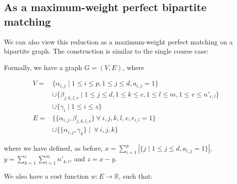 \subsection{As a maximum-weight perfect bipartite matching}
We can also view this reduction as a maximum-weight perfect matching on a bipartite graph. The construction is similar to the single course case:

\begin{center}
\end{center}

Formally, we have a graph $G = (V, E)$, where

\begin{align*}
  V = & \{\alpha_{i, j} \mid 1 \le i \le p, 1 \le j \le d, a_{i, j} = 1\}\\
    & \cup \{\beta_{j, k, l, v} \mid 1 \le j \le d, 1 \le k \le c, 1 \le l \le m, 1 \le v \le n'_{c, l}\}\\
    & \cup \{\gamma_i \mid 1 \le i \le z\}\\
  E = & \{\{\alpha_{i, j}, \beta_{j, k, l, v}\}\ \forall\ i, j, k, l, v, r_{i, l} = 1\}\\
      & \cup \{\{\alpha_{i, j}, \gamma_k\} \mid \ \forall\ i, j, k\}
\end{align*}

where we have defined, as before, $x = \sum_{i = 1}^p |\{j \mid 1 \le j \le d, a_{i, j} = 1\}|$, $y = \sum_{k = 1}^c \sum_{l = 1}^m n'_{k, l}$, and $z = x - y$.

We also have a cost function $w:E \to \mathbb{R}$, such that:

